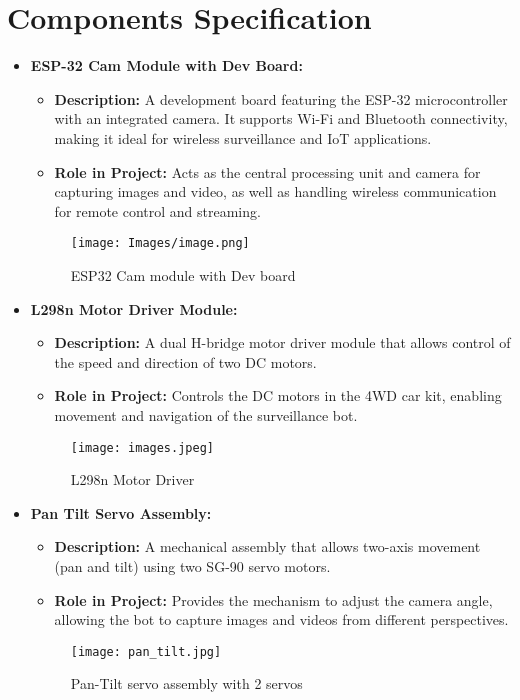 \documentclass[12pt]{article}
\begin{document}
\newpage

\section{Components Specification}
\newline
\begin{itemize}
    \item \textbf{ESP-32 Cam Module with Dev Board:}
    \begin{itemize}
        \item \textbf{Description:} A development board featuring the ESP-32 microcontroller with an integrated camera. It supports Wi-Fi and Bluetooth connectivity, making it ideal for wireless surveillance and IoT applications.
        \item \textbf{Role in Project:} Acts as the central processing unit and camera for capturing images and video, as well as handling wireless communication for remote control and streaming.
    \end{itemize}
    \begin{figure}[h]
        \centering
        \texttt{[image: Images/image.png]}
        \caption{ESP32 Cam module with Dev board}
        \label{fig:enter-label}
    \end{figure}

    \item \textbf{L298n Motor Driver Module:}
    \begin{itemize}
        \item \textbf{Description:} A dual H-bridge motor driver module that allows control of the speed and direction of two DC motors.
        \item \textbf{Role in Project:} Controls the DC motors in the 4WD car kit, enabling movement and navigation of the surveillance bot.
    \end{itemize}
    \begin{figure}[h]
        \centering
        \texttt{[image: images.jpeg]}
        \caption{L298n Motor Driver}
        \label{fig:enter-label}
    \end{figure}
\newpage
    \item \textbf{Pan Tilt Servo Assembly:}
    \begin{itemize}
        \item \textbf{Description:} A mechanical assembly that allows two-axis movement (pan and tilt) using two SG-90 servo motors.
        \item \textbf{Role in Project:} Provides the mechanism to adjust the camera angle, allowing the bot to capture images and videos from different perspectives.
    \end{itemize}
    \begin{figure}[h]
        \centering
        \texttt{[image: pan\_tilt.jpg]}
        \caption{Pan-Tilt servo assembly with 2 servos}
        \label{fig:enter-label}
    \end{figure}

    \end{itemize}
\end{document}
